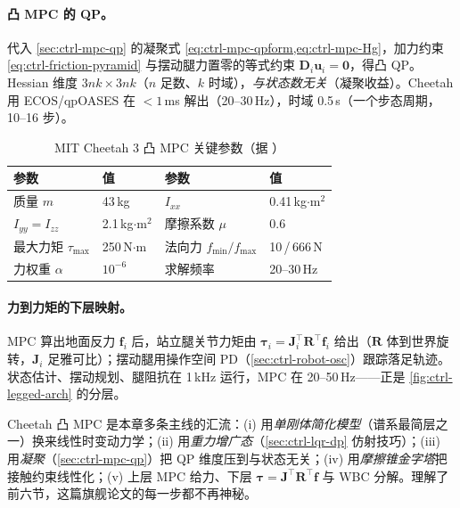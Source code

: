 \paragraph{凸 MPC 的 QP。}
代入 \cref{sec:ctrl-mpc-qp} 的凝聚式 \cref{eq:ctrl-mpc-qpform,eq:ctrl-mpc-Hg}，加力约束 \cref{eq:ctrl-friction-pyramid} 与摆动腿力置零的等式约束 $\mathbf{D}_i\mathbf{u}_i=\mathbf{0}$，得凸 QP\cite{dicarlo2018cheetah}。Hessian 维度 $3nk\times3nk$（$n$ 足数、$k$ 时域），\emph{与状态数无关}（凝聚收益）。Cheetah 用 ECOS/qpOASES 在 $<1$\,ms 解出（20--30\,Hz），时域 0.5\,s（一个步态周期，10--16 步）。

\begin{table}[H]\centering\small
\caption{MIT Cheetah 3 凸 MPC 关键参数（据 \cite{dicarlo2018cheetah}）}
\label{tab:ctrl-cheetah}
\begin{tabular}{llll}
\toprule
参数 & 值 & 参数 & 值 \\
\midrule
质量 $m$ & 43\,kg & $I_{xx}$ & 0.41\,kg$\cdot$m$^2$ \\
$I_{yy}=I_{zz}$ & 2.1\,kg$\cdot$m$^2$ & 摩擦系数 $\mu$ & 0.6 \\
最大力矩 $\tau_{\max}$ & 250\,N$\cdot$m & 法向力 $f_{\min}/f_{\max}$ & 10\,/\,666\,N \\
力权重 $\alpha$ & $10^{-6}$ & 求解频率 & 20--30\,Hz \\
\bottomrule
\end{tabular}
\end{table}

\paragraph{力到力矩的下层映射。}
MPC 算出地面反力 $\mathbf{f}_i$ 后，站立腿关节力矩由 $\boldsymbol{\tau}_i=\mathbf{J}_i^\top\mathbf{R}^\top\mathbf{f}_i$ 给出（$\mathbf{R}$ 体到世界旋转，$\mathbf{J}_i$ 足雅可比）；摆动腿用操作空间 PD（\cref{sec:ctrl-robot-osc}）跟踪落足轨迹。状态估计、摆动规划、腿阻抗在 1\,kHz 运行，MPC 在 20--50\,Hz——正是 \cref{fig:ctrl-legged-arch} 的分层。

\begin{insight}
Cheetah 凸 MPC 是本章多条主线的汇流：(i) 用\emph{单刚体简化模型}（谱系最简层之一）换来线性时变动力学；(ii) 用\emph{重力增广态}（\cref{sec:ctrl-lqr-dp} 仿射技巧）；(iii) 用\emph{凝聚}（\cref{sec:ctrl-mpc-qp}）把 QP 维度压到与状态无关；(iv) 用\emph{摩擦锥金字塔}把接触约束线性化；(v) 上层 MPC 给力、下层 $\boldsymbol{\tau}=\mathbf{J}^\top\mathbf{R}^\top\mathbf{f}$ 与 WBC 分解。理解了前六节，这篇旗舰论文的每一步都不再神秘。
\end{insight}


